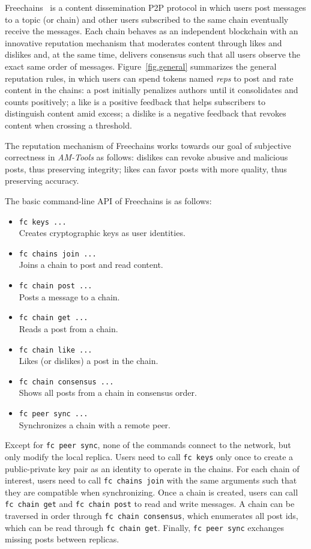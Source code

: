 \documentclass[12pt]{article}
\newcommand{\AMT}      {\emph{AM-Tools}\xspace}
\newcommand{\code}[1]  {\texttt{\footnotesize{#1}}}
\begin{document}
Freechains~\cite{fcs.sbseg20} is a content dissemination P2P protocol in which
users post messages to a topic (or chain) and other users subscribed to the
same chain eventually receive the messages.
%
Each chain behaves as an independent blockchain with an innovative reputation
mechanism that moderates content through likes and dislikes and, at the same
time, delivers consensus such that all users observe the exact same order of
messages.
%
Figure~\ref{fig.general} summarizes the general reputation rules, in which
users can spend tokens named \emph{reps} to post and rate content in the
chains:
    a post initially penalizes authors until it consolidates and counts positively;
    a like is a positive feedback that helps subscribers to distinguish content amid excess;
    a dislike is a negative feedback that revokes content when crossing a threshold.

The reputation mechanism of Freechains works towards our goal of subjective
correctness in \AMT as follows:
    dislikes can revoke abusive and malicious posts, thus preserving integrity;
    likes can favor posts with more quality, thus preserving accuracy.

The basic command-line API of Freechains is as follows:

\begin{itemize}
\item \code{fc keys ...} \\
    Creates cryptographic keys as user identities.
\item \code{fc chains join ...} \\
    Joins a chain to post and read content.
\item \code{fc chain post ...} \\
    Posts a message to a chain.
\item \code{fc chain get ...} \\
    Reads a post from a chain.
\item \code{fc chain like ...} \\
    Likes (or dislikes) a post in the chain.
\item \code{fc chain consensus ...} \\
    Shows all posts from a chain in consensus order.
\item \code{fc peer sync ...} \\
    Synchronizes a chain with a remote peer.
\end{itemize}

Except for \code{fc~peer~sync}, none of the commands connect to the network,
but only modify the local replica.
%
Users need to call \code{fc~keys} only once to create a public-private key pair
as an identity to operate in the chains.
%
For each chain of interest, users need to call \code{fc~chains~join} with the
same arguments such that they are compatible when synchronizing.
%
Once a chain is created, users can call \code{fc~chain~get} and
\code{fc~chain~post} to read and write messages.
%
A chain can be traversed in order through \code{fc~chain~consensus}, which
enumerates all post ids, which can be read through \code{fc~chain~get}.
%
Finally, \code{fc~peer~sync} exchanges missing posts between replicas.
\end{document}
